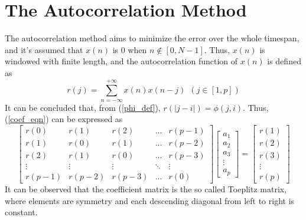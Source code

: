 \documentclass[preprint,12pt]{elsarticle}
\begin{document}
\section{The Autocorrelation Method}\label{S:2}
The autocorrelation method aims to minimize the error over the whole timespan, and it's assumed that $x(n)$ is 0 when $n \notin [0,N-1]$. Thus, $x(n)$ is windowed with finite length, and the autocorrelation function of $x(n)$ is defined as
\begin{equation}
	r(j) = \sum_{n=-\infty}^{+\infty} x(n)x(n-j) \ \ (j \in [1, p])
\end{equation}
It can be concluded that, from (\ref{phi_def}), $r(|j-i|) = \phi(j, i)$. Thus, (\ref{coef_eqn}) can be expressed as
\begin{equation}
	\begin{bmatrix}
		r(0) & r(1) & r(2) & ... & r(p-1) \\ 
		r(1) & r(0) & r(1) & ... & r(p-2) \\
		r(2) & r(1) & r(0) & ... & r(p-3) \\
		\vdots & \vdots & \vdots & \ddots & \vdots \\
		r(p-1) & r(p-2) & r(p-3) & ... & r(0)
	\end{bmatrix}
	\begin{bmatrix}
	a_1 \\ a_2 \\ a_3 \\ \vdots \\ a_p
	\end{bmatrix}
	=
	\begin{bmatrix}
		r(1) \\ r(2) \\ r(3) \\ \vdots \\ r(p)
	\end{bmatrix}
\end{equation}
It can be observed that the coefficient matrix is the so called Toeplitz matrix, where elements are symmetry and  each descending diagonal from left to right is constant.
\end{document}
